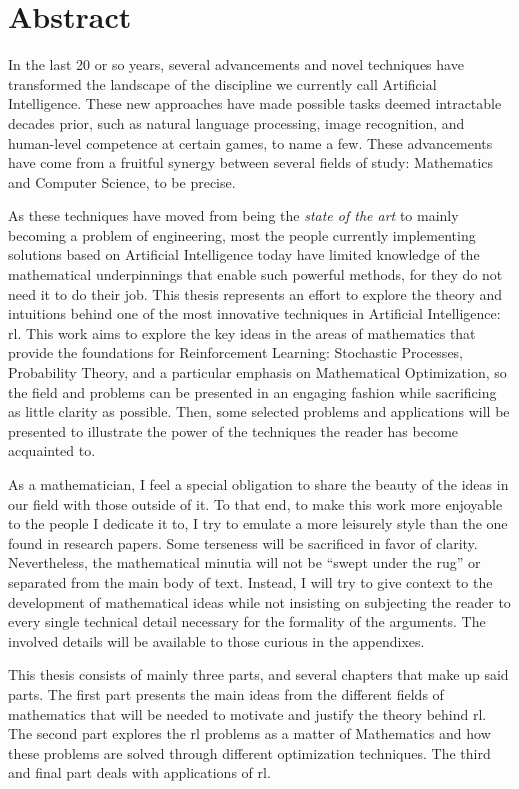 
\chapter*{Abstract}
In the last 20 or so years, several advancements and novel techniques have
transformed the landscape of the discipline we currently call Artificial
Intelligence. These new approaches have made possible tasks deemed intractable
decades prior, such as natural language processing, image recognition, and
human-level competence at certain games, to name a few. These advancements have
come from a fruitful synergy between several fields of study: Mathematics and
Computer Science, to be precise.

As these techniques have moved from being the \textit{state of the art} to
mainly becoming a problem of engineering, most the people currently implementing
solutions based on Artificial Intelligence today have limited knowledge of the
mathematical underpinnings that enable such powerful methods, for they do not 
need it to do their job. This thesis represents an effort to explore the theory
and intuitions behind one of the most innovative techniques in Artificial
Intelligence: \ac{rl}. This work aims to explore the key ideas in
the areas of mathematics that provide the foundations for Reinforcement
Learning: Stochastic Processes, Probability Theory, and a particular emphasis on
Mathematical Optimization, so the field and problems can be presented in an
engaging fashion while sacrificing as little clarity as possible. Then, some 
selected problems and applications will be presented to illustrate the power of
the techniques the reader has become acquainted to. 

As a mathematician, I feel a special obligation to share the beauty of the ideas
in our field with those outside of it. To that end, to make this work more
enjoyable to the people I dedicate it to, I try to emulate a more leisurely
style than the one found in research papers.  Some terseness will be sacrificed
in favor of clarity. Nevertheless, the mathematical minutia will not be ``swept
under the rug'' or separated from the main body of text. Instead, I will try to
give context to the development of mathematical ideas while not insisting on
subjecting the reader to every single technical detail necessary for the
formality of the arguments. The involved details will be available to those
curious in the appendixes.

This thesis consists of mainly three parts, and several chapters that make up
said parts. The first part presents the main ideas from the different fields of
mathematics that will be needed to motivate and justify the theory behind
\ac{rl}. The second part explores the \ac{rl}
problems as a matter of Mathematics and how these problems are solved through
different optimization techniques. The third and final part deals with
applications of \ac{rl}.

